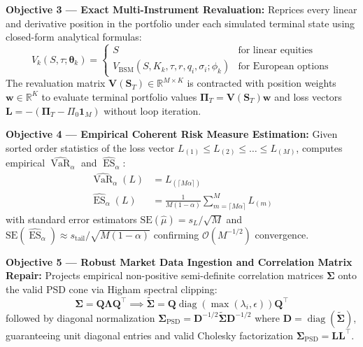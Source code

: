 \documentclass{article}
\theoremstyle{plain}
\theoremstyle{definition}
\theoremstyle{remark}
\DeclareMathOperator{\VaR}{VaR}
\DeclareMathOperator{\ES}{ES}
\DeclareMathOperator{\diag}{diag}
\begin{document}
\textbf{Objective 3 — Exact Multi-Instrument Revaluation:} Reprices every linear and derivative position in the portfolio under each simulated terminal state using closed-form analytical formulas:
\begin{equation}
    V_k(S, \tau; \boldsymbol{\theta}_k) = \begin{cases} S & \text{for linear equities} \\ V_{\text{BSM}}(S, K_k, \tau, r, q_i, \sigma_i; \phi_k) & \text{for European options} \end{cases}
\end{equation}
The revaluation matrix $\mathbf{V}(\mathbf{S}_T) \in \mathbb{R}^{M \times K}$ is contracted with position weights $\mathbf{w} \in \mathbb{R}^K$ to evaluate terminal portfolio values $\boldsymbol{\Pi}_T = \mathbf{V}(\mathbf{S}_T)\mathbf{w}$ and loss vectors $\mathbf{L} = -(\boldsymbol{\Pi}_T - \Pi_0 \mathbf{1}_M)$ without loop iteration.

\textbf{Objective 4 — Empirical Coherent Risk Measure Estimation:} Given sorted order statistics of the loss vector $L_{(1)} \le L_{(2)} \le \dots \le L_{(M)}$, computes empirical $\widehat{\VaR}_\alpha$ and $\widehat{\ES}_\alpha$:
\begin{align}
    \widehat{\VaR}_\alpha(L) &= L_{(\lceil M\alpha \rceil)} \\
    \widehat{\ES}_\alpha(L) &= \frac{1}{M(1 - \alpha)} \sum_{m=\lceil M\alpha \rceil}^M L_{(m)}
\end{align}
with standard error estimators $\text{SE}(\hat{\mu}) = s_L / \sqrt{M}$ and $\text{SE}(\widehat{\ES}_\alpha) \approx s_{\text{tail}} / \sqrt{M(1-\alpha)}$ confirming $\mathcal{O}(M^{-1/2})$ convergence.

\textbf{Objective 5 — Robust Market Data Ingestion and Correlation Matrix Repair:} Projects empirical non-positive semi-definite correlation matrices $\mathbf{\Sigma}$ onto the valid PSD cone via Higham spectral clipping:
\begin{equation}
    \mathbf{\Sigma} = \mathbf{Q}\mathbf{\Lambda}\mathbf{Q}^\top \implies \widetilde{\mathbf{\Sigma}} = \mathbf{Q} \diag(\max(\lambda_i, \epsilon)) \mathbf{Q}^\top
\end{equation}
followed by diagonal normalization $\mathbf{\Sigma}_{\text{PSD}} = \mathbf{D}^{-1/2}\widetilde{\mathbf{\Sigma}}\mathbf{D}^{-1/2}$ where $\mathbf{D} = \diag(\widetilde{\mathbf{\Sigma}})$, guaranteeing unit diagonal entries and valid Cholesky factorization $\mathbf{\Sigma}_{\text{PSD}} = \mathbf{L}\mathbf{L}^\top$.
\end{document}
